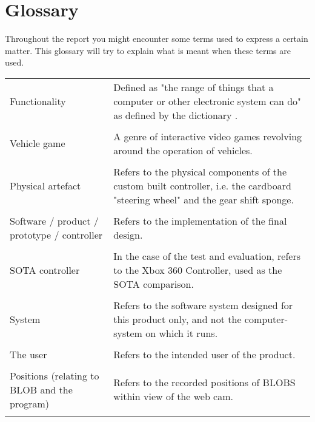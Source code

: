 \section*{Glossary}
Throughout the report you might encounter some terms used to express a certain matter. This glossary will try to explain what is meant when these terms are used.
\begin{table}[!htbp]
\begin{tabular}{p{2in} p{3.4in}}
Functionality & Defined as "the range of things that a computer or other electronic system can do" as defined by the dictionary \parencite{Macmillan2005}.\\
&\\
Vehicle game & A genre of interactive video games revolving around the operation of vehicles.\\
 & \\
Physical artefact & Refers to the physical components of the custom built controller, i.e. the cardboard "steering wheel" and the gear shift sponge.\\
 & \\
Software / product / prototype / controller & Refers to the implementation of the final design.\\
 & \\
SOTA controller & In the case of the test and evaluation, refers to the Xbox 360 Controller, used as the SOTA comparison.\\
 & \\
System & Refers to the software system designed for this product only, and not the computer-system on which it runs.\\
 & \\
The user & Refers to the intended user of the product.\\
 & \\
Positions (relating to BLOB and the program) & Refers to the recorded positions of BLOBS within view of the web cam.\\
 & \\
 
\end{tabular}
\end{table}